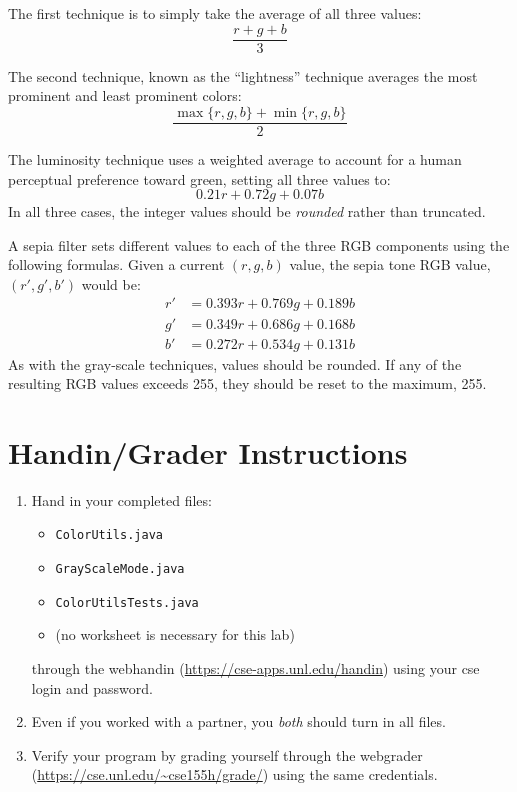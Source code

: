 \documentclass[12pt]{scrartcl}
\begin{document}
The first technique is to simply take the average of all three values:
  $$\frac{r + g + b}{3}$$

The second technique, known as the ``lightness'' technique averages 
the most prominent and least prominent colors:
  $$\frac{\max\{r, g, b\} + \min\{r, g, b\}}{2}$$

The luminosity technique uses a weighted average to account for a human 
perceptual preference toward green, setting all three values to:
  $$0.21 r + 0.72 g + 0.07 b$$
In all three cases, the integer values should be \emph{rounded} rather 
than truncated.

A sepia filter sets different values to each of the three RGB components 
using the following formulas.  Given a current $(r,g,b)$ value, the sepia
tone RGB value, $(r',g',b')$ would be:
$$\begin{array}{ll}
  r' &= 0.393r + 0.769g + 0.189b \\
  g' &= 0.349r + 0.686g + 0.168b \\
  b' &= 0.272r + 0.534g + 0.131b
\end{array}$$
As with the gray-scale techniques, values should be rounded.  If any of
the resulting RGB values exceeds 255, they should be reset to the 
maximum, 255.

\section{Handin/Grader Instructions}

\begin{enumerate}
  \item Hand in your completed files:
  \begin{itemize}
    \item \texttt{ColorUtils.java}
    \item \texttt{GrayScaleMode.java}
    \item \texttt{ColorUtilsTests.java}
    \item (no worksheet is necessary for this lab)
  \end{itemize}
  through the webhandin (\url{https://cse-apps.unl.edu/handin}) 
  using your cse login and password.  
  \item Even if you worked with a partner, you \emph{both} should
  turn in all files.
  \item Verify your program by grading yourself through the
  webgrader (\url{https://cse.unl.edu/~cse155h/grade/}) using the
  same credentials.
\end{enumerate}
\end{document}
